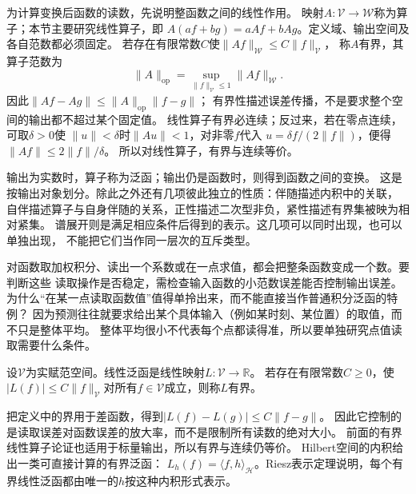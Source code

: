 为计算变换后函数的读数，先说明整函数之间的线性作用。
映射$A:\mathcal V\to\mathcal W$称为算子；本节主要研究线性算子，即
$A(af+bg)=aAf+bAg$。定义域、输出空间及各自范数都必须固定。
若存在有限常数$C$使$\lVert Af\rVert_{\mathcal W}\leq C\lVert f\rVert_{\mathcal V}$，
称$A$有界，其算子范数为
\[
 \lVert A\rVert_{\mathrm{op}}
 =\sup_{\lVert f\rVert_{\mathcal V}\leq1}\lVert Af\rVert_{\mathcal W}.
\]
因此$\lVert Af-Ag\rVert\leq\lVert A\rVert_{\mathrm{op}}\lVert f-g\rVert$；
有界性描述误差传播，不是要求整个空间的输出都不超过某个固定值。
线性算子有界必连续；反过来，若在零点连续，可取$\delta>0$使
$\lVert u\rVert<\delta$时$\lVert Au\rVert<1$，对非零$f$代入
$u=\delta f/(2\lVert f\rVert)$，便得$\lVert Af\rVert\leq2\lVert f\rVert/\delta$。
所以对线性算子，有界与连续等价。

输出为实数时，算子称为泛函；输出仍是函数时，则得到函数之间的变换。
这是按输出对象划分。除此之外还有几项彼此独立的性质：伴随描述内积中的关联，
自伴描述算子与自身伴随的关系，正性描述二次型非负，紧性描述有界集被映为相对紧集。
谱展开则是满足相应条件后得到的表示。这几项可以同时出现，也可以单独出现，
不能把它们当作同一层次的互斥类型。

对函数取加权积分、读出一个系数或在一点求值，都会把整条函数变成一个数。要判断这些
读取操作是否稳定，需检查输入函数的小范数误差能否控制输出误差。
为什么“在某一点读取函数值”值得单拎出来，而不能直接当作普通积分泛函的特例？
因为预测往往就要求给出某个具体输入（例如某时刻、某位置）的取值，而不只是整体平均。
整体平均很小不代表每个点都读得准，所以要单独研究点值读取需要什么条件。
\begin{definition}[有界线性泛函]
\label{def:functional-bounded-linear-functional}
设$\mathcal V$为实赋范空间。线性泛函是线性映射$L:\mathcal V\to\mathbb R$。
若存在有限常数$C\geq0$，使
$|L(f)|\leq C\lVert f\rVert_{\mathcal V}$对所有$f\in\mathcal V$成立，则称$L$有界。
\end{definition}
把定义中的界用于差函数，得到$|L(f)-L(g)|\leq C\lVert f-g\rVert$。
因此它控制的是读取误差对函数误差的放大率，而不是限制所有读数的绝对大小。
前面的有界线性算子论证也适用于标量输出，所以有界与连续仍等价。
Hilbert空间的内积给出一类可直接计算的有界泛函：
$L_h(f)=\langle f,h\rangle_{\mathcal{H}}$。Riesz表示定理说明，每个有界线性泛函都由唯一的$h$按这种内积形式表示。

